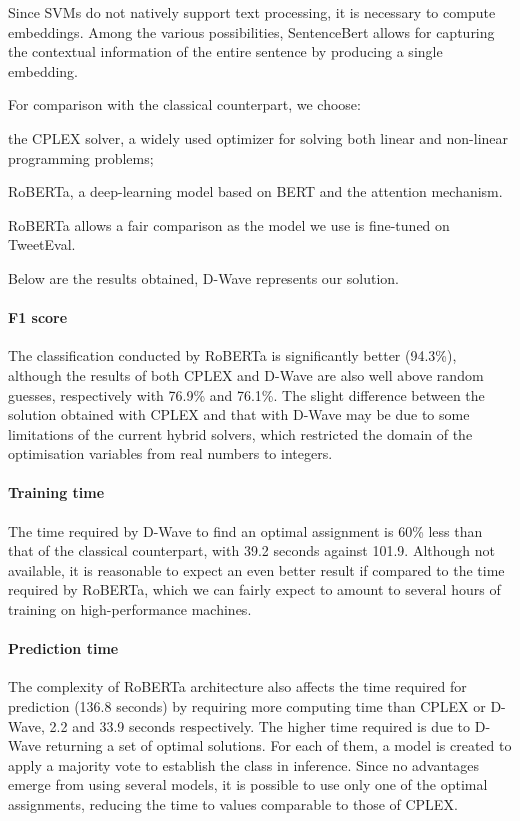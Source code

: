 \documentclass{ceurart}
\begin{document}
Since SVMs do not natively support text processing, it is necessary to compute embeddings. Among the various possibilities, SentenceBert\cite{SentenceBert} allows for capturing the contextual information of the entire sentence by producing a single embedding.

For comparison with the classical counterpart, we choose:
\begin{enumerate*}[label=\arabic*)]
    \item the CPLEX\cite{cplex} solver, a widely used optimizer for solving both linear and non-linear programming problems;
    \item RoBERTa\cite{ROBERTA}, a deep-learning model based on BERT\cite{BERT} and the attention mechanism\cite{Attention}.
\end{enumerate*}
RoBERTa allows a fair comparison as the model we use\cite{robertamodel} is fine-tuned on TweetEval.

Below are the results obtained, D-Wave represents our solution.

\paragraph{F1 score} The classification conducted by RoBERTa is significantly better (94.3\%), although the results of both CPLEX and D-Wave are also well above random guesses, respectively with 76.9\% and 76.1\%. 
The slight difference between the solution obtained with CPLEX and that with D-Wave may be due to some limitations of the current hybrid solvers, which restricted the domain of the optimisation variables from real numbers to integers.

\paragraph{Training time} The time required by D-Wave to find an optimal assignment is 60\% less than that of the classical counterpart, with 39.2 seconds against 101.9. 
Although not available, it is reasonable to expect an even better result if compared to the time required by RoBERTa, which we can fairly expect to amount to several hours of training on high-performance machines.

\paragraph{Prediction time} The complexity of RoBERTa architecture also affects the time required for prediction (136.8 seconds) by requiring more computing time than CPLEX or D-Wave, 2.2 and 33.9 seconds respectively. The higher time required is due to D-Wave returning a set of optimal solutions. For each of them, a model is created to apply a majority vote to establish the class in inference. Since no advantages emerge from using several models, it is possible to use only one of the optimal assignments, reducing the time to values comparable to those of CPLEX.
\end{document}
